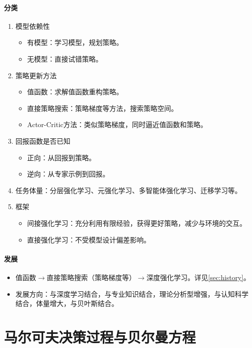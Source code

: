 \documentclass[
12pt, %
a4paper, 
oneside, %
]{scrartcl}
\begin{document}
\paragraph{分类}
\begin{enumerate}
\item 模型依赖性
\begin{itemize}
\item 有模型：学习模型，规划策略。
\item 无模型：直接试错策略。
\end{itemize}
\item 策略更新方法
\begin{itemize}
\item 值函数：求解值函数重构策略。
\item 直接策略搜索：策略梯度等方法，搜索策略空间。
\item Actor-Critic方法：类似策略梯度，同时逼近值函数和策略。
\end{itemize}
\item 回报函数是否已知
\begin{itemize}
\item 正向：从回报到策略。
\item 逆向：从专家示例到回报。
\end{itemize}
\item 任务体量：分层强化学习、元强化学习、多智能体强化学习、迁移学习等。
\item 框架
\begin{itemize}
\item 间接强化学习：充分利用有限经验，获得更好策略，减少与环境的交互。
\item 直接强化学习：不受模型设计偏差影响。
\end{itemize}
\end{enumerate}
\paragraph{发展}\label{sec:history back}
\begin{itemize}
\item 值函数$ \rightarrow $直接策略搜索（策略梯度等）$ \rightarrow $深度强化学习。详见\ref{sec:history}。
\item 发展方向：与深度学习结合，与专业知识结合，理论分析型增强，与认知科学结合，体量增大，与贝叶斯结合。
\end{itemize}
\section{马尔可夫决策过程与贝尔曼方程}
\end{document}
